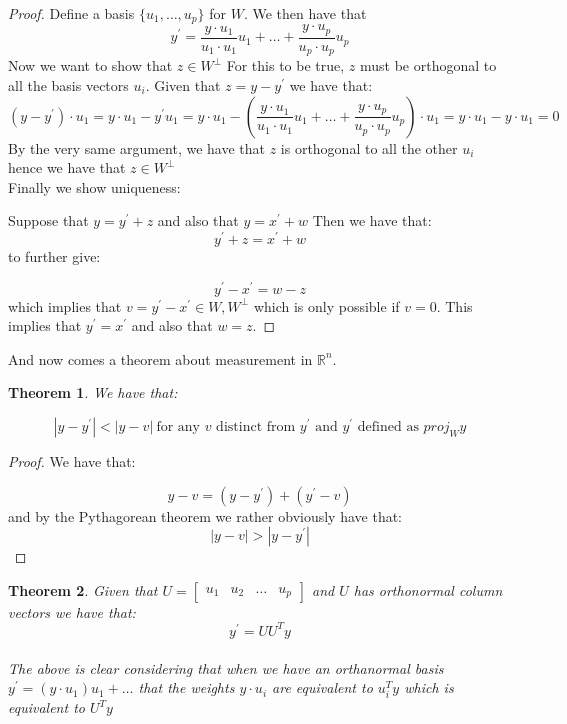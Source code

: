 \documentclass[titlepage]{article}
\newtheorem{thm}{Theorem}[subsection]
\numberwithin{equation}{subsection}
\newcommand{\Rn}{\mathbb{R}^n}
\begin{document}
\begin{proof}
Define a basis $\{u_{1}, \ldots, u_{p}\}$ for $W$. We then have that $$ y^{'} = \frac{y\cdot u_{1}}{u_{1}\cdot u_{1}}u_{1}+ \ldots + \frac{y \cdot u_{p}}{u_{p} \cdot u_{p}}u_{p}$$ Now we want to show that $z \in W^{\perp}$ For this to be true, $z$ must be orthogonal to all the basis vectors $u_{i}$. Given that $z = y - y^{'}$ we have that:
$$ (y-y^{'})\cdot u_{1} = y\cdot u_{1} - y^{'}u_{1} = y\cdot u_{1} - ( \frac{y\cdot u_{1}}{u_{1}\cdot u_{1}}u_{1}+ \ldots + \frac{y \cdot u_{p}}{u_{p} \cdot u_{p}}u_{p}) \cdot u_{1} = y\cdot u_{1} - y \cdot u_{1} = 0$$ By the very same argument, we have that $z$ is orthogonal to all the other $u_{i}$ hence we have that $z \in W^{\perp}$ 
\\

Finally we show uniqueness:

Suppose that $y = y^{'} + z$ and also that $y = x^{'} + w$ Then we have that:
$$ y^{'} + z = x^{'} + w $$ to further give: 

$$ y^{'} - x^{'} = w - z$$ which implies that $v = y^{'} - x^{'} \in W,W^{\perp}$ which is only possible if $v = 0$. This implies that $y^{'} = x^{'}$ and also that $w = z$. 
\end{proof}

And now comes a theorem about measurement in $\Rn$.

\begin{thm}
We have that:

$$|y-y^{'}| < |y - v| \ \text{for any $v$ distinct from $y^{'}$ and $y^{'}$ defined as $proj_{W}y$}$$
\end{thm}

\begin{proof}
We have that:

$$y-v = (y - y^{'})+(y^{'} - v)$$ and by the Pythagorean theorem we rather obviously have that:
$$ |y-v| > |y - y^{'}|$$
\end{proof}

\begin{thm}
Given that $U = \begin{bmatrix}
    u_{1} & u_{2} & \ldots & u_{p}
\end{bmatrix}$ and $U$ has orthonormal column vectors we have that:
$$y^{'} = UU^{T}y$$
\\

The above is clear considering that when we have an orthanormal basis $y^{'} = (y \cdot u_{1})u_{1} + \ldots$ that the weights $y \cdot u_{i}$ are equivalent to $u_{i}^{T}y$ which is equivalent to $U^{T}y$
\end{thm}
\end{document}
